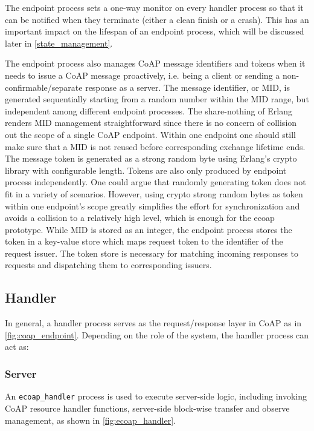 The endpoint process sets a one-way monitor on every handler process so that it can be notified when they terminate (either a clean finish or a crash). This has an important impact on the lifespan of an endpoint process, which will be discussed later in \autoref{state_management}. 

The endpoint process also manages CoAP message identifiers and tokens when it needs to issue a CoAP message proactively, i.e. being a client or sending a non-confirmable/separate response as a server. The message identifier, or MID, is generated sequentially starting from a random number within the MID range, but independent among different endpoint processes. The share-nothing of Erlang renders MID management straightforward since there is no concern of collision out the scope of a single CoAP endpoint. Within one endpoint one should still make sure that a MID is not reused before corresponding exchange lifetime ends. The message token is generated as a strong random byte using Erlang's crypto library with configurable length. Tokens are also only produced by endpoint process independently. One could argue that randomly generating token does not fit in a variety of scenarios. However, using crypto strong random bytes as token within one endpoint's scope greatly simplifies the effort for synchronization and avoids a collision to a relatively high level, which is enough for the ecoap prototype. While MID is stored as an integer, the endpoint process stores the token in a key-value store which maps request token to the identifier of the request issuer. The token store is necessary for matching incoming responses to requests and dispatching them to corresponding issuers.

\subsection{Handler}\label{coap_handler}

In general, a handler process serves as the request/response layer in CoAP as in \autoref{fig:coap_endpoint}. Depending on the role of the system, the handler process can act as:

\subsubsection{Server}

An \verb|ecoap_handler| process is used to execute server-side logic, including invoking CoAP resource handler functions, server-side block-wise transfer and observe management, as shown in \autoref{fig:ecoap_handler}. 

